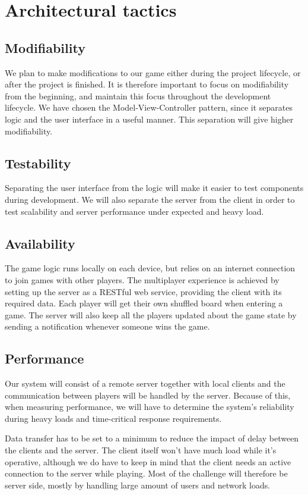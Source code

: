 \section{Architectural tactics}
\label{sec:architecturaltactics}

\subsection{Modifiability} 
We plan to make modifications to our game either during the project lifecycle,
or after the project is finished. It is therefore important to focus on
modifiability from the beginning, and maintain this focus throughout the
development lifecycle. We have chosen the Model-View-Controller pattern, since
it separates logic and the user interface in a useful manner. This separation
will give higher modifiability.

\subsection{Testability}
Separating the user interface from the logic will make it easier to test
components during development. We will also separate the server from the
client in order to test scalability and server performance under expected and
heavy load.

\subsection{Availability} 
The game logic runs locally on each device, but relies on an internet
connection to join games with other players. The multiplayer experience is
achieved by setting up the server as a RESTful web service, providing the
client with its required data. Each player will get their own shuffled board
when entering a game. The server will also keep all the players updated about
the game state by sending a notification whenever someone wins the game.

\subsection{Performance}
Our system will consist of a remote server together with local clients and the
communication between players will be handled by the server. Because of this,
when measuring performance, we will have to determine the system's reliability
during heavy loads and time-critical response requirements.

Data transfer has to be set to a minimum to reduce the impact of delay between
the clients and the server. The client itself won't have much load while it's
operative, although we do have to keep in mind that the client needs an
active connection to the server while playing. Most of the challenge will
therefore be server side, mostly by handling large amount of users and network
loads.

